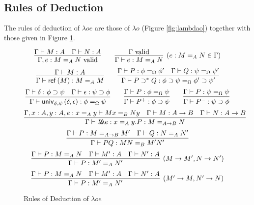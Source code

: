 
\subsection{Rules of Deduction}

The rules of deduction of $\lambda o e$ are those of $\lambda o$ (Figure \ref{fig:lambdao}) together with those given in Figure \ref{fig:lambdaoe}.

\begin{figure}
\begin{framed}
\[ \infer{\Gamma, e : M =_A N \vald}{\Gamma \vdash M : A \quad \Gamma \vdash N : A}
\qquad
\infer[(e : M =_A N \in \Gamma)]{\Gamma \vdash e : M =_A N}{\Gamma \vald} \]
\[ \infer{\Gamma \vdash \reff{M} : M =_A M}{\Gamma \vdash M : A}
\qquad
\infer{\Gamma \vdash P \supset^* Q : \phi \supset \psi =_\Omega \phi' \supset \psi'}{\Gamma \vdash P : \phi =_\Omega \phi' \quad \Gamma \vdash Q : \psi =_\Omega \psi'} \]
\[ \infer{\Gamma \vdash \univ{\phi}{\psi}{\delta}{\epsilon} : \phi =_\Omega \psi}{\Gamma \vdash \delta : \phi \supset \psi \quad \Gamma \vdash \epsilon : \psi \supset \phi} 
\qquad
\infer{\Gamma \vdash P^+ : \phi \supset \psi}{\Gamma \vdash P : \phi =_\Omega \psi}
\qquad
\infer{\Gamma \vdash P^- : \psi \supset \phi}{\Gamma \vdash P : \psi =_\Omega \psi} \]
\[ \infer{\Gamma \vdash \triplelambda e : x =_A y . P : M =_{A \rightarrow B} N}{\Gamma, x : A, y : A, e : x =_A y \vdash M x =_B N y \quad \Gamma \vdash M : A \rightarrow B \quad
\Gamma \vdash N : A \rightarrow B} \]
\[ \infer{\Gamma \vdash PQ : MN =_B M' N'}{\Gamma \vdash P : M =_{A \rightarrow B} M' \quad \Gamma \vdash Q : N =_A N'} \]
\[ \infer[(M \rightarrow M', N \rightarrow N')]{\Gamma \vdash P : M' =_A N'}{\Gamma \vdash P : M =_A N \quad \Gamma \vdash M' : A \quad \Gamma \vdash N' : A} \]
\[ \infer[(M' \rightarrow M, N' \rightarrow N)]{\Gamma \vdash P : M' =_A N'}{\Gamma \vdash P : M =_A N \quad \Gamma \vdash M' : A \quad \Gamma \vdash N' : A} \]
\end{framed}
\caption{Rules of Deduction of $\lambda oe$}
\label{fig:lambdaoe}
\end{figure}

